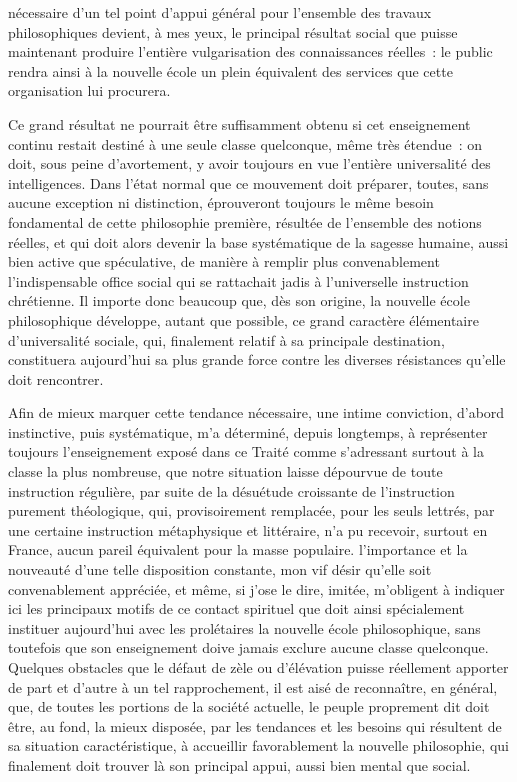 \documentclass[french,twoside]{book} %
\begin{document}
nécessaire d’un tel point d’appui général pour l’ensemble des travaux philosophiques devient, à mes yeux, le principal résultat social que puisse maintenant produire l’entière vulgarisation des connaissances réelles : le public rendra ainsi à la nouvelle école un plein équivalent des services que cette organisation lui procurera.\par
Ce grand résultat ne pourrait être suffisamment obtenu si cet enseignement continu restait destiné à une seule classe quelconque, même très étendue : on doit, sous peine d’avortement, y avoir toujours en vue l’entière universalité des intelligences. Dans l’état normal que ce mouvement doit préparer, toutes, sans aucune exception ni distinction, éprouveront toujours le même besoin fondamental de cette philosophie première, résultée de l’ensemble des notions réelles, et qui doit alors devenir la base systématique de la sagesse humaine, aussi bien active que spéculative, de manière à remplir plus convenablement l’indispensable office social qui se rattachait jadis à l’universelle instruction chrétienne. Il importe donc beaucoup que, dès son origine, la nouvelle école philosophique développe, autant que possible, ce grand caractère élémentaire d’universalité sociale, qui, finalement relatif à sa principale destination, constituera aujourd’hui sa plus grande force contre les diverses résistances qu’elle doit rencontrer.\par
Afin de mieux marquer cette tendance nécessaire, une intime conviction, d’abord instinctive, puis systématique, m’a déterminé, depuis longtemps, à représenter toujours l’enseignement exposé dans ce Traité comme s’adressant surtout à la classe la plus nombreuse, que notre situation laisse dépourvue de toute instruction régulière, par suite de la désuétude croissante de l’instruction purement théologique, qui, provisoirement remplacée, pour les seuls lettrés, par une certaine instruction métaphysique et littéraire, n’a pu recevoir, surtout en France, aucun pareil équivalent pour la masse populaire. l’importance et la nouveauté d’une telle disposition constante, mon vif désir qu’elle soit convenablement appréciée, et même, si j’ose le dire, imitée, m’obligent à indiquer ici les principaux motifs de ce contact spirituel que doit ainsi spécialement instituer aujourd’hui avec les prolétaires la nouvelle école philosophique, sans toutefois que son enseignement doive jamais exclure aucune classe quelconque. Quelques obstacles que le défaut de zèle ou d’élévation puisse réellement apporter de part et d’autre à un tel rapprochement, il est aisé de reconnaître, en général, que, de toutes les portions de la société actuelle, le peuple proprement dit doit être, au fond, la mieux disposée, par les tendances et les besoins qui résultent de sa situation caractéristique, à accueillir favorablement la nouvelle philosophie, qui finalement doit trouver là son principal appui, aussi bien mental que social.\par
\end{document}
